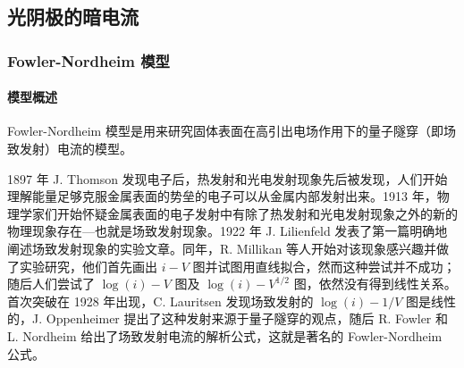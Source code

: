 \documentclass[ignorenonframetext, t]{beamer}
\begin{document}
\subsection{光阴极的暗电流}

\begin{frame}
	\frametitle{Fowler-Nordheim 模型}
	\framesubtitle{模型概述}
	Fowler-Nordheim 模型是用来研究固体表面在高引出电场作用下的量子隧穿（即场致发射）电流的模型。
	\begin{background}
	1897 年 J. Thomson 发现电子后，热发射和光电发射现象先后被发现，人们开始理解能量足够克服金属表面的势垒的电子可以从金属内部发射出来。1913 年，物理学家们开始怀疑金属表面的电子发射中有除了热发射和光电发射现象之外的新的物理现象存在---也就是场致发射现象。1922 年 J. Lilienfeld 发表了第一篇明确地阐述场致发射现象的实验文章。同年，R. Millikan 等人开始对该现象感兴趣并做了实验研究，他们首先画出 $i-V$ 图并试图用直线拟合，然而这种尝试并不成功；随后人们尝试了 $\log(i)-V$ 图及 $\log(i)-V^{1/2}$ 图，依然没有得到线性关系。首次突破在 1928 年出现，C. Lauritsen 发现场致发射的 $\log(i)-1/V$ 图是线性的，J. Oppenheimer 提出了这种发射来源于量子隧穿的观点，随后 R. Fowler 和 L. Nordheim 给出了场致发射电流的解析公式，这就是著名的 Fowler-Nordheim 公式。
	\end{background}
\end{frame}
\end{document}
